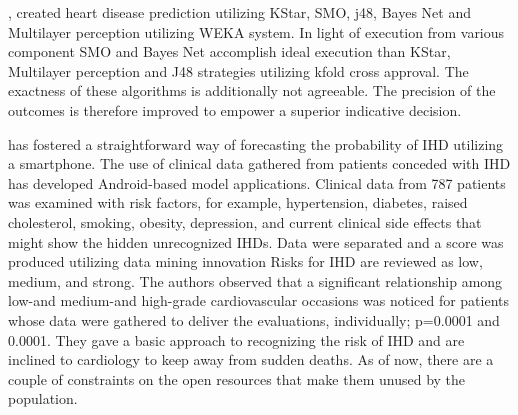{\citealp{sultana2016analysis}, created heart disease prediction utilizing KStar, SMO, j48, Bayes Net and Multilayer perception utilizing WEKA system. In light of execution from various component SMO and Bayes Net accomplish ideal execution than KStar, Multilayer perception and J48 strategies utilizing kfold cross approval. The exactness of these algorithms is additionally not agreeable. The precision of the outcomes is therefore improved to empower a superior indicative decision.

\citealp{raihan2016smartphone} has fostered a straightforward way of forecasting the probability of IHD utilizing a smartphone. The use of clinical data gathered from patients conceded with IHD has developed Android-based model applications. Clinical data from 787 patients was examined with risk factors, for example, hypertension, diabetes, raised cholesterol, smoking, obesity, depression, and current clinical side effects that might show the hidden unrecognized  IHDs. Data were separated and a score was produced utilizing data mining innovation Risks for IHD are reviewed as low, medium, and strong. The authors observed that a significant relationship among low-and medium-and high-grade cardiovascular occasions was noticed for patients whose data were gathered to deliver the evaluations, individually; p=0.0001 and 0.0001. They gave a basic approach to recognizing the risk of IHD and are inclined to cardiology to keep away from sudden deaths. As of now, there are a couple of constraints on the open resources that make them unused by the population.

}
